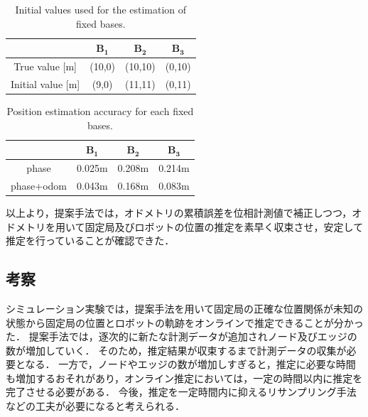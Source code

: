 \documentclass[a4jsme]{jsmepaper}
\begin{document}
\begin{table}
    \centering
    \caption{Initial values used for the estimation of fixed bases.}
    \begin{tabular}{|c|c|c|c|}
    \hline    
        & $\mathbf{B_1}$ & $\mathbf{B_2}$ & $\mathbf{B_3}$ \\
    \hline    
       True value [m] &(10,0)  &(10,10) &(0,10) \\
       Initial value [m] &(9,0)  &(11,11) &(0,11) \\
    \hline
    \end{tabular}
    \label{tab:initial}
\end{table}

\begin{table}
    \centering
    \caption{Position estimation accuracy for each fixed bases.}
    \begin{tabular}{|c|c|c|c|}
    \hline    
    &$\mathbf{B_1}$ & $\mathbf{B_2}$ & $\mathbf{B_3}$ \\
    \hline    
    phase&0.025m  &0.208m &0.214m \\
    phase+odom &0.043m  &0.168m &0.083m \\
    \hline
    \end{tabular}
    \label{tab:base_error}
\end{table}
以上より，提案手法では，オドメトリの累積誤差を位相計測値で補正しつつ，オドメトリを用いて固定局及びロボットの位置の推定を素早く収束させ，安定して推定を行っていることが確認できた．
\subsection{考察}
シミュレーション実験では，提案手法を用いて固定局の正確な位置関係が未知の状態から固定局の位置とロボットの軌跡をオンラインで推定できることが分かった．
提案手法では，逐次的に新たな計測データが追加されノード及びエッジの数が増加していく．
そのため，推定結果が収束するまで計測データの収集が必要となる．
一方で，ノードやエッジの数が増加しすぎると，推定に必要な時間も増加するおそれがあり，オンライン推定においては，一定の時間以内に推定を完了させる必要がある．
今後，推定を一定時間内に抑えるリサンプリング手法などの工夫が必要になると考えられる．
\end{document}
